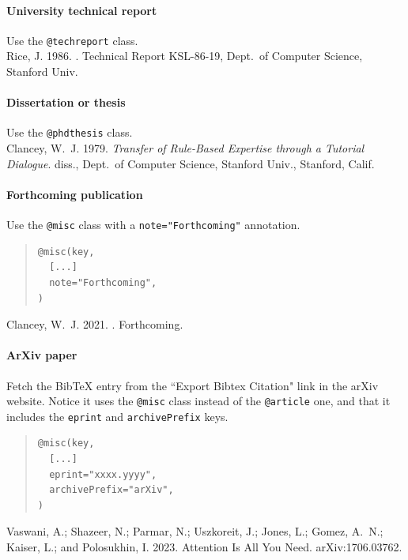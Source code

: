 \paragraph{University technical report} Use the \texttt{@techreport} class.\\[.2em]
\nocite{r:86}
Rice, J. 1986.
.
\newblock Technical Report KSL-86-19, Dept.\ of Computer Science, Stanford
  Univ.

\paragraph{Dissertation or thesis} Use the \texttt{@phdthesis} class.\\[.2em]
\nocite{c:79}
Clancey, W.~J. 1979.
\newblock \emph{{Transfer of Rule-Based Expertise through a Tutorial
  Dialogue}}.
 diss., Dept.\ of Computer Science, Stanford Univ., Stanford,
  Calif.

\paragraph{Forthcoming publication} Use the \texttt{@misc} class with a \texttt{note="Forthcoming"} annotation.
\begin{quote}
\begin{footnotesize}
\begin{verbatim}
@misc(key,
  [...]
  note="Forthcoming",
)
\end{verbatim}
\end{footnotesize}
\end{quote}
\nocite{c:21}
Clancey, W.~J. 2021.
.
\newblock Forthcoming.

\paragraph{ArXiv paper} Fetch the BibTeX entry from the ``Export Bibtex Citation" link in the arXiv website. Notice it uses the \texttt{@misc} class instead of the \texttt{@article} one, and that it includes the \texttt{eprint} and \texttt{archivePrefix} keys.
\begin{quote}
\begin{footnotesize}
\begin{verbatim}
@misc(key,
  [...]
  eprint="xxxx.yyyy",
  archivePrefix="arXiv",
)
\end{verbatim}
\end{footnotesize}
\end{quote}
\nocite{c:22}
Vaswani, A.; Shazeer, N.; Parmar, N.; Uszkoreit, J.; Jones, L.; Gomez, A.~N.;
  Kaiser, L.; and Polosukhin, I. 2023.
\newblock Attention Is All You Need.
\newblock arXiv:1706.03762.

